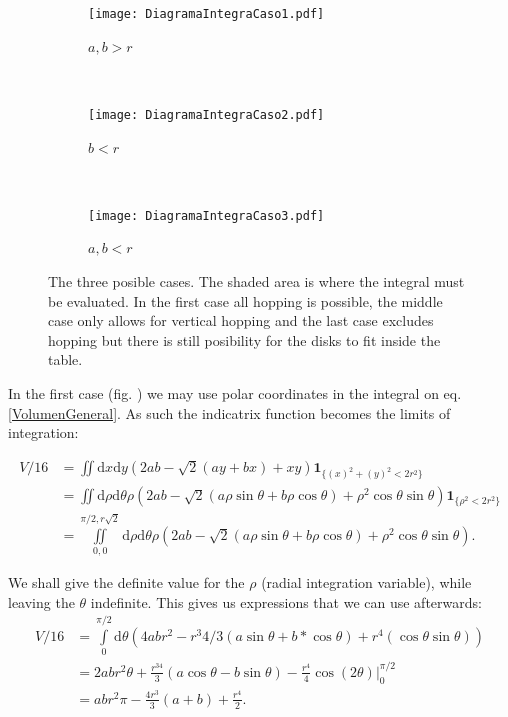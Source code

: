 \documentclass[letterpaper,10pt, jcp, aps]{revtex4-1}
\newcommand{\rd}{\!\mathrm{d}}
\newcommand{\indicator}[1]{\mathbf{1}_{ \{   #1 \} } }
\begin{document}
\begin{figure}[h]
        \centering
        \begin{subfigure}[b]{0.32\textwidth}
          \centering
          \texttt{[image: DiagramaIntegraCaso1.pdf]}
          \caption{$a,b>r$}
          \label{smallradious}
        \end{subfigure}%
        ~ %
        \begin{subfigure}[b]{0.32\textwidth}
          \centering
          \texttt{[image: DiagramaIntegraCaso2.pdf]}
          \caption{$b<r$}
          \label{mediumradius}
        \end{subfigure}%
        ~ %
        \begin{subfigure}[b]{0.32\textwidth}
          \centering
          \texttt{[image: DiagramaIntegraCaso3.pdf]}
          \caption{$a,b<r$}
          \label{bigradious}
        \end{subfigure}%
        \caption{The three posible cases. The shaded area is where the integral
          must be evaluated. In the first case all hopping is possible, the middle case
          only allows for vertical hopping and the last case excludes hopping but there
        is still posibility for the disks to fit inside the table.}
\label{CasosIntegra}
\end{figure}
In the first case (fig. \label{smallradius})  we may use polar coordinates in the
integral on eq. \ref{VolumenGeneral}. As such the indicatrix function becomes
the limits of integration:

\begin{equation}
\begin{split}
V/16 &=\iint \rd x \rd y (2ab-\sqrt{2}(ay+bx)+x y)
\indicator{(x)^2+(y)^2<2r^2 }\\
&=\iint \rd \rho \rd \theta \rho (2ab
-\sqrt{2}(a\rho\sin\theta+b\rho\cos\theta)
+\rho^2 \cos\theta\sin\theta)
\indicator{\rho^2<2r^2 }\\
&=\iint\limits_{0,0}^{\pi/2,r\sqrt{2}} \rd \rho \rd \theta \rho (2ab
-\sqrt{2}(a\rho\sin\theta+b\rho\cos\theta)
+\rho^2 \cos\theta\sin\theta).
\end{split}
\end{equation}

We shall give the definite value for the $\rho$ (radial integration variable),
while leaving the $\theta$ indefinite. This gives us expressions that we can use afterwards:
\begin{equation}\label{volftheta}
\begin{split}
V/16 &=\int\limits_0^{\pi/2}  \rd \theta  
(4abr^2 - r^3 4/3 (a\sin\theta+b*\cos\theta)+r^4 (\cos\theta\sin\theta))\\
&=2abr^2\theta
+\frac{r^34}{3}(a\cos\theta-b\sin\theta)
-\frac{r^4}{4}\cos (2\theta) \bigg\vert_0^{\pi/2} \\
& =abr^2 \pi 
-\frac{4r^3}{3}(a+b)
+\frac{r^4}{2}.
\end{split}
\end{equation}
\end{document}
